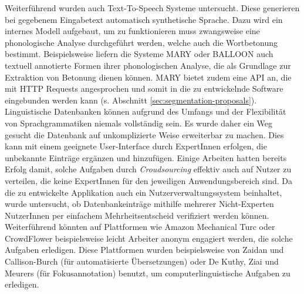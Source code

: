 Weiterführend wurden auch Text-To-Speech Systeme untersucht. Diese generieren bei gegebenem Eingabetext automatisch synthetische Sprache. Dazu wird ein internes Modell aufgebaut, um zu funktionieren muss zwangsweise eine phonologische Analyse durchgeführt werden, welche auch die Wortbetonung bestimmt. Beispielsweise liefern die Systeme MARY\cite{Schroder2003} oder BALLOON\cite{Reichel2012} auch textuell annotierte Formen ihrer phonologischen Analyse, die als Grundlage zur Extraktion von Betonung dienen können. MARY bietet zudem eine API an, die mit HTTP Requests angesprochen und somit in die zu entwickelnde Software eingebunden werden kann (s. Abschnitt \ref{sec:segmentation-proposals}).\\

Linguistische Datenbanken können aufgrund des Umfangs und der Flexibilität von Sprachgrammatiken niemals vollständig sein. Es wurde daher ein Weg gesucht die Datenbank auf unkomplizierte Weise erweiterbar zu machen. Dies kann mit einem geeignete User-Interface durch ExpertInnen erfolgen, die unbekannte Einträge ergänzen und hinzufügen. Einige Arbeiten hatten bereits Erfolg damit, solche Aufgaben durch \textit{Croudsourcing} effektiv auch auf Nutzer zu verteilen, die keine ExpertInnen für den jeweiligen Anwendungsbereich sind. Da die zu entwickelte Applikation auch ein Nutzerverwaltungssystem beinhaltet, wurde untersucht, ob Datenbankeinträge mithilfe mehrerer Nicht-Experten NutzerInnen per einfachem Mehrheitsentscheid verifiziert werden können. Weiterführend könnten auf Plattformen wie Amazon Mechanical Turc oder CrowdFlower beispielsweise leicht Arbeiter anonym engagiert werden, die solche Aufgaben erledigen\cite{Snow2008}. Diese Plattformen wurden beispielsweise von Zaidan und Callison-Burch (für automatisierte Übersetzungen)\cite{Zaidan2011} oder De Kuthy, Ziai und Meurers\cite{Meurers2015} (für Fokusannotation) benutzt, um computerlinguistische Aufgaben zu erledigen.